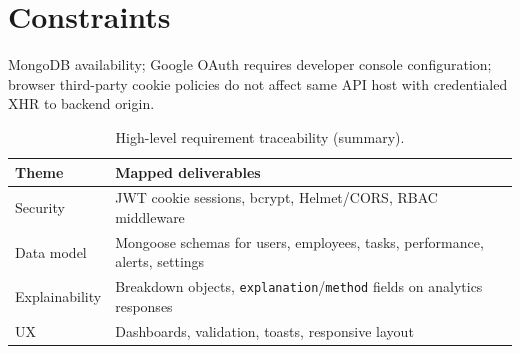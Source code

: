 \section{Constraints}
MongoDB availability; Google OAuth requires developer console configuration; browser third-party cookie policies do not affect same API host with credentialed XHR to backend origin.

\begin{table}[H]
  \centering
  \caption{High-level requirement traceability (summary).}
  \label{tab:req-trace}
  \begin{tabular}{p{3.2cm}p{9cm}}
    \toprule
    \textbf{Theme} & \textbf{Mapped deliverables} \\
    \midrule
    Security & JWT cookie sessions, bcrypt, Helmet/CORS, RBAC middleware \\
    Data model & Mongoose schemas for users, employees, tasks, performance, alerts, settings \\
    Explainability & Breakdown objects, \texttt{explanation}/\texttt{method} fields on analytics responses \\
    UX & Dashboards, validation, toasts, responsive layout \\
    \bottomrule
  \end{tabular}
\end{table}

